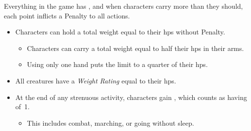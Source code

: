 
Everything in the game has , and when characters carry more than they should, each point inflicts a Penalty to all actions.

\begin{itemize}
  \item
  Characters can hold a total \gls{weight} equal to their \glspl{hp} without Penalty.
  \begin{itemize}
  \item
  Characters can carry a total \gls{weight} equal to half their \glspl{hp} in their arms.
  \item
  Using only one hand puts the limit to a quarter of their \glspl{hp}.
  \end{itemize}
  \item
  All creatures have a \textit{Weight Rating} equal to their \glspl{hp}.
  \item
  At the end of any strenuous activity, characters gain , which counts as having  of~1.
  \begin{itemize}
    \item
    This includes combat, marching, or going without sleep.
  \end{itemize}
\end{itemize}
